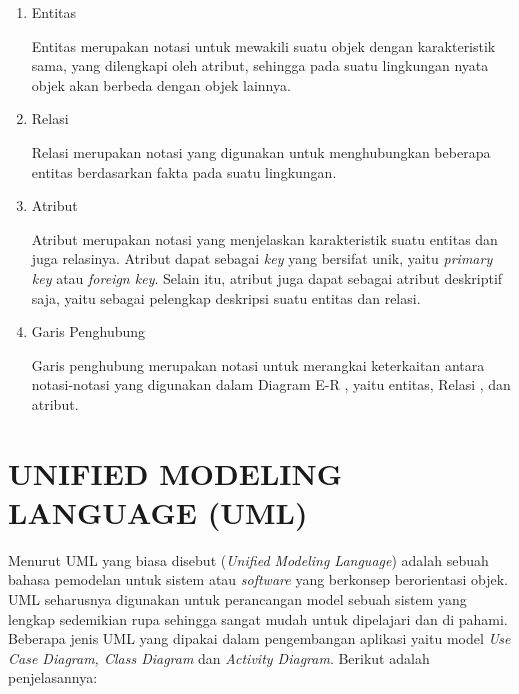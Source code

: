 \begin{enumerate}
	\item Entitas
	\par Entitas merupakan notasi untuk mewakili suatu objek dengan karakteristik sama, yang dilengkapi oleh atribut, sehingga pada suatu lingkungan nyata objek akan berbeda dengan objek lainnya.
	\item Relasi
	\par Relasi merupakan notasi yang digunakan untuk menghubungkan beberapa entitas berdasarkan fakta pada suatu lingkungan.
	\item Atribut
	\par Atribut merupakan notasi yang menjelaskan karakteristik suatu entitas dan juga relasinya. Atribut dapat sebagai \textit{key} yang bersifat unik, yaitu \textit{primary key} atau \textit{foreign key}. Selain itu, atribut juga dapat sebagai atribut deskriptif saja, yaitu sebagai pelengkap deskripsi suatu entitas dan relasi.	
	\item Garis Penghubung
	\par Garis penghubung merupakan notasi untuk merangkai keterkaitan antara notasi-notasi yang digunakan dalam Diagram E-R , yaitu entitas, Relasi , dan atribut.
\end{enumerate}

\section{\uppercase{Unified Modeling language (UML)}}
Menurut \citep{nugraha2016perancangan} UML yang biasa disebut (\textit{Unified Modeling Language}) adalah sebuah bahasa pemodelan untuk sistem atau \textit{software} yang berkonsep berorientasi objek. UML seharusnya digunakan untuk perancangan model sebuah sistem yang lengkap sedemikian rupa sehingga sangat mudah untuk dipelajari dan di pahami. Beberapa jenis UML yang dipakai dalam pengembangan aplikasi yaitu model \textit{Use Case Diagram, Class Diagram} dan \textit{Activity Diagram}. Berikut adalah penjelasannya:

